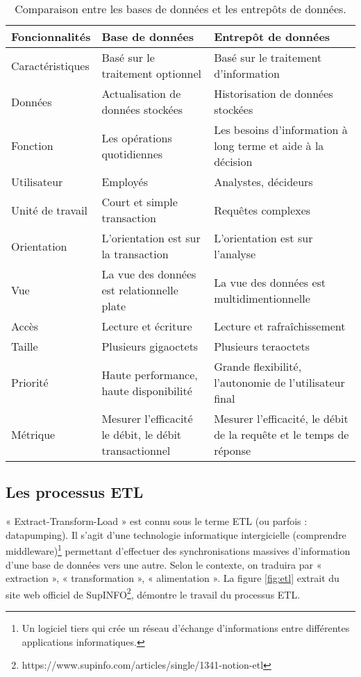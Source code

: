 \begin{table}[H]
    \centering
    \caption{Comparaison entre les bases de données et les entrepôts de données.}
    \begin{tabular}[t]{|p{3cm}|p{6cm}|p{6cm}|} 
        \hline
        \textbf{Foncionnalités} & \textbf{Base de données} & \textbf{Entrepôt de données} \\
        \hline\hline
        Caractéristiques & Basé sur le traitement optionnel & Basé sur le traitement
        d’information \\
        \hline
        Données & Actualisation de données stockées & Historisation de données stockées \\ 
        \hline
        Fonction & Les opérations quotidiennes & Les besoins d’information à long terme et aide à la décision \\ 
        \hline
        Utilisateur & Employés & Analystes, décideurs \\ 
        \hline
        Unité de travail & Court et simple transaction & Requêtes complexes \\ 
        \hline
        Orientation & L’orientation est sur la transaction & L’orientation est sur l’analyse \\ 
        \hline
        Vue & La vue des données est relationnelle plate & La vue des données est multidimentionnelle \\ 
        \hline
        Accès & Lecture et écriture & Lecture et rafraîchissement \\
        \hline
        Taille & Plusieurs gigaoctets & Plusieurs teraoctets \\
        \hline
        Priorité & Haute performance, haute disponibilité & Grande flexibilité, l’autonomie de l’utilisateur final \\
        \hline
        Métrique & Mesurer l’efficacité le débit, le débit transactionnel & Mesurer l’efficacité, le débit de la requête et le temps de réponse \\ 
        \hline\hline
    \end{tabular}
    \label{tab:comparaisonbdded}
\end{table}%



\subsection{Les processus ETL}
« Extract-Transform-Load » est connu sous le terme ETL (ou parfois : datapumping). Il s'agit d'une technologie informatique intergicielle (comprendre middleware)\footnote{Un logiciel tiers qui crée un réseau d'échange d'informations entre différentes applications informatiques.} permettant d'effectuer des synchronisations massives d'information d'une base de données vers une autre. Selon le contexte, on traduira par « extraction », « transformation », « alimentation ». La figure \ref{fig:etl} extrait du site web officiel de SupINFO\footnote{https://www.supinfo.com/articles/single/1341-notion-etl}, démontre le travail du processus ETL. 

